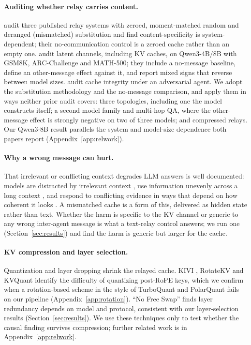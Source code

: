 \documentclass[11pt]{article}
\begin{document}
\paragraph{Auditing whether relay carries content.}
\citet{latentcommpay2026} audit three published relay systems with zeroed,
moment-matched random and deranged (mismatched) substitution and find
content-specificity is system-dependent; their no-communication control is a
zeroed cache rather than an empty one. \citet{zhangemu2026} audit latent
channels, including KV caches, on Qwen3-4B/8B with GSM8K, ARC-Challenge and
MATH-500; they include a no-message baseline, define an other-message effect
against it, and report mixed signs that reverse between model sizes.
\citet{latentagentslie2026} audit cache integrity under an adversarial agent.
We adopt the substitution methodology and the no-message comparison, and apply
them in ways neither prior audit covers: three topologies, including one the
model constructs itself; a second model family and multi-hop QA, where the
other-message effect is strongly negative on two of three models; and
compressed relays. Our Qwen3-8B result parallels the system and model-size
dependence both papers report (Appendix~\ref{app:relwork}).

\paragraph{Why a wrong message can hurt.} That irrelevant or conflicting
context degrades LLM answers is well documented: models are distracted by
irrelevant context \citep{shi2023distracted}, use information unevenly across a
long context \citep{liu2024lost}, and respond to conflicting evidence in ways
that depend on how coherent it looks \citep{xie2024knowledgeconflicts}. A
mismatched cache is a form of this, delivered as hidden state rather than
text. Whether the harm is specific to the KV channel or generic to any wrong
inter-agent message is what a text-relay control answers; we run one
(Section~\ref{sec:results}) and find the harm is generic but larger for the cache.

\paragraph{KV compression and layer selection.} Quantization and layer
dropping shrink the relayed cache. KIVI \citep{kivi2024}, RotateKV
\citep{rotatekv2025} and KVQuant \citep{kvquant2024} identify the
difficulty of quantizing post-RoPE keys, which we confirm when a
rotation-based scheme in the style of TurboQuant \citep{turboquant2026}
and PolarQuant \citep{polarquant2026} fails on our pipeline
(Appendix~\ref{app:rotation}). ``No Free Swap'' \citep{nofreeswap2026}
finds layer redundancy depends on model and protocol, consistent with
our layer-selection results (Section~\ref{sec:results}). We use these
techniques only to test whether the causal finding survives compression;
further related work is in Appendix~\ref{app:relwork}.
\end{document}
